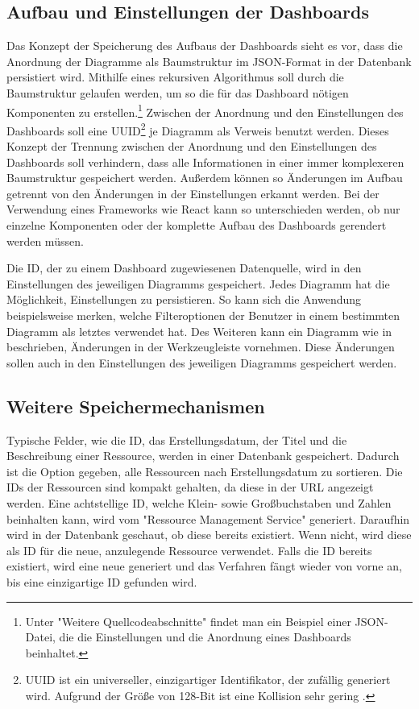 \subsection{Aufbau und Einstellungen der Dashboards}
\label{subsec:aufbauundeinstellungenderdashboards}
Das Konzept der Speicherung des Aufbaus der Dashboards sieht es vor, dass die Anordnung 
der Diagramme als Baumstruktur im JSON-Format in der Datenbank persistiert wird. Mithilfe eines
rekursiven Algorithmus soll durch die Baumstruktur gelaufen werden, um so die für das Dashboard
nötigen Komponenten zu erstellen.\footnote{Unter "Weitere Quellcodeabschnitte" findet man ein Beispiel
einer JSON-Datei, die die Einstellungen und die Anordnung eines Dashboards beinhaltet.}
Zwischen der Anordnung und den Einstellungen des Dashboards soll eine UUID\footnote{UUID ist ein universeller,
einzigartiger Identifikator, der zufällig generiert wird. Aufgrund der Größe
von 128-Bit ist eine Kollision sehr gering \cite{UUIDJavaSEDocs}.} 
je Diagramm als Verweis benutzt werden. Dieses Konzept der Trennung zwischen
der Anordnung und den Einstellungen des Dashboards soll verhindern, dass
alle Informationen in einer immer komplexeren Baumstruktur gespeichert werden.
Außerdem können so Änderungen im Aufbau getrennt von den Änderungen in der
Einstellungen erkannt werden. Bei der Verwendung eines Frameworks
wie React kann so unterschieden werden, ob nur einzelne Komponenten
oder der komplette Aufbau des Dashboards gerendert werden müssen.

Die ID, der zu einem Dashboard zugewiesenen Datenquelle, wird in den Einstellungen
des jeweiligen Diagramms gespeichert. Jedes Diagramm hat die Möglichkeit,
Einstellungen zu persistieren. So kann sich die Anwendung beispielsweise merken,
welche Filteroptionen der Benutzer in einem bestimmten Diagramm als letztes verwendet
hat. Des Weiteren kann ein Diagramm wie in  beschrieben,
Änderungen in der Werkzeugleiste vornehmen. Diese Änderungen
sollen auch in den Einstellungen des jeweiligen Diagramms gespeichert werden.

\subsection{Weitere Speichermechanismen}
\label{subsec:weiterespeichermechanismen}
Typische Felder, wie die ID, das Erstellungsdatum, der Titel und die Beschreibung einer Ressource,
werden in einer Datenbank gespeichert. Dadurch ist die Option gegeben, alle
Ressourcen nach Erstellungsdatum zu sortieren. Die IDs der Ressourcen sind kompakt gehalten,
da diese in der URL angezeigt werden. Eine achtstellige ID, welche Klein- sowie Großbuchstaben
und Zahlen beinhalten kann, wird vom "Ressource Management Service"
generiert. Daraufhin wird in der Datenbank geschaut, ob diese bereits existiert. Wenn nicht,
wird diese als ID für die neue, anzulegende Ressource verwendet. Falls die ID bereits existiert,
wird eine neue generiert und das Verfahren fängt wieder von vorne an, bis eine einzigartige ID gefunden wird.

